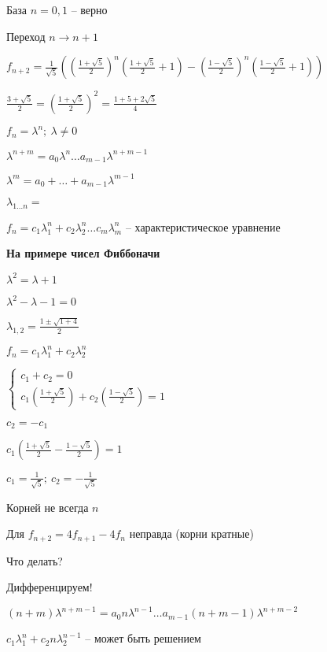 \documentclass[14pt, letter paper]{article}
\begin{document}
База $n = 0, 1$ -- верно

Переход $n \rightarrow n + 1$

$f_{n+2} = \frac{1}{\sqrt{5}}((\frac{1 + \sqrt{5}}{2})^n(\frac{1 + \sqrt{5}}{2} + 1) - (\frac{1 - \sqrt{5}}{2})^n(\frac{1 - \sqrt{5}}{2} + 1))$

$\frac{3 + \sqrt{5}}{2} = (\frac{1 + \sqrt{5}}{2})^2 = \frac{1 + 5 + 2 \sqrt{5}}{4}$

\vspace{5mm}

$f_n = \lambda^n;\ \lambda \neq 0$

$\lambda^{n+m} = a_0\lambda^n \ldots a_{m-1}\lambda^{n+m-1}$

$\lambda^m = a_0 + \ldots + a_{m-1}\lambda^{m-1}$

$\lambda_{1\ldots n} = $

$f_n = c_1\lambda_1^n + c_2\lambda_2^n \ldots c_m\lambda_m^n$ -- характеристическое уравнение

\vspace{5mm}

\textbf{На примере чисел Фиббоначи}

$\lambda^2 = \lambda + 1$

$\lambda^2 - \lambda - 1 = 0$

$\lambda_{1, 2} = \frac{1 \pm \sqrt{1 + 4}}{2}$

$f_n = c_1\lambda_1^n + c_2\lambda_2^n$

$\begin{cases}
    c_1 + c_2 = 0 \\
    c_1(\frac{1 + \sqrt{5}}{2}) + c_2(\frac{1 - \sqrt{5}}{2}) = 1
\end{cases}$

$c_2 = -c_1$

$c_1(\frac{1 + \sqrt{5}}{2} - \frac{1 - \sqrt{5}}{2}) = 1$

$c_1 = \frac{1}{\sqrt{5}};\ c_2 = -\frac{1}{\sqrt{5}}$

\vspace{5mm}

Корней не всегда $n$

Для $f_{n+2} = 4f_{n+1} - 4f_n$ неправда (корни кратные)

Что делать?

Дифференцируем!

\vspace{5mm}

$(n+m)\lambda^{n+m-1} = a_0n\lambda^{n-1} \ldots a_{m-1}(n+m-1)\lambda^{n+m-2}$

$c_1\lambda_1^n + c_2n\lambda_2^{n-1}$ -- может быть решением
\end{document}
